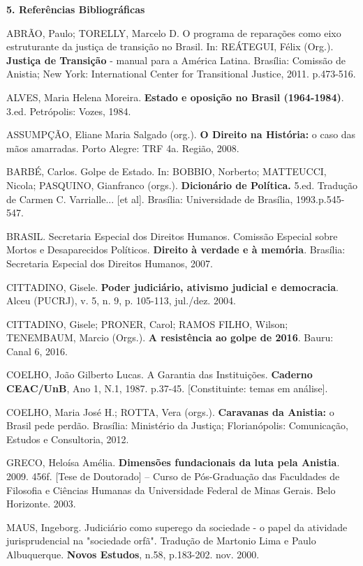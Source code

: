 \textbf{5. Referências Bibliográficas}

ABRÃO, Paulo; TORELLY, Marcelo D. O programa de reparações como eixo
estruturante da justiça de transição no Brasil. In: REÁTEGUI, Félix
(Org.). \textbf{Justiça de Transição} - manual para a América Latina.
Brasília: Comissão de Anistia; New York: International Center for
Transitional Justice, 2011. p.473-516.

ALVES, Maria Helena Moreira. \textbf{Estado e oposição no Brasil
(1964-1984)}. 3.ed. Petrópolis: Vozes, 1984.

ASSUMPÇÃO, Eliane Maria Salgado (org.). \textbf{O Direito na História:}
o caso das mãos amarradas. Porto Alegre: TRF 4a. Região, 2008.

BARBÉ, Carlos. Golpe de Estado. In: BOBBIO, Norberto; MATTEUCCI, Nicola;
PASQUINO, Gianfranco (orgs.). \textbf{Dicionário de Política.} 5.ed.
Tradução de Carmen C. Varrialle... {[}et al{]}. Brasília: Universidade
de Brasília, 1993.p.545-547.

BRASIL. Secretaria Especial dos Direitos Humanos. Comissão Especial
sobre Mortos e Desaparecidos Políticos. \textbf{Direito à verdade e à
memória}. Brasília: Secretaria Especial dos Direitos Humanos, 2007.

CITTADINO, Gisele. \textbf{Poder judiciário, ativismo judicial e
democracia}. Alceu (PUCRJ), v. 5, n. 9, p. 105-113, jul./dez. 2004.

CITTADINO, Gisele; PRONER, Carol; RAMOS FILHO, Wilson; TENEMBAUM, Marcio
(Orgs.). \textbf{A resistência ao golpe de 2016}. Bauru: Canal 6, 2016.

COELHO, João Gilberto Lucas. A Garantia das Instituições.
\textbf{Caderno CEAC/UnB}, Ano 1, N.1, 1987. p.37-45. {[}Constituinte:
temas em análise{]}.

COELHO, Maria José H.; ROTTA, Vera (orgs.). \textbf{Caravanas da
Anistia:} o Brasil pede perdão. Brasília: Ministério da Justiça;
Florianópolis: Comunicação, Estudos e Consultoria, 2012.

GRECO, Heloísa Amélia. \textbf{Dimensões fundacionais da luta pela
Anistia}. 2009. 456f. {[}Tese de Doutorado{]} -- Curso de Pós-Graduação
das Faculdades de Filosofia e Ciências Humanas da Universidade Federal
de Minas Gerais. Belo Horizonte. 2003.

MAUS, Ingeborg. Judiciário como superego da sociedade - o papel da
atividade jurisprudencial na "sociedade orfã". Tradução de Martonio Lima
e Paulo Albuquerque. \textbf{Novos Estudos}, n.58, p.183-202. nov. 2000.

